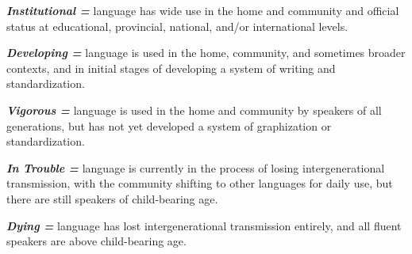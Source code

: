 \begin{styleBody}
\textbf{\textit{Institutional} \textit{=}} language has wide use in the home and community and official status at educational, provincial, national, and/or international levels. 
\end{styleBody}

\begin{styleBody}
\textbf{\textit{Developing} \textit{=}} language is used in the home, community, and sometimes broader contexts, and in initial stages of developing a system of writing and standardization. 
\end{styleBody}

\begin{styleBody}
\textbf{\textit{Vigorous} \textit{=}} language is used in the home and community by speakers of all generations, but has not yet developed a system of graphization or standardization. 
\end{styleBody}

\begin{styleBody}
\textbf{\textit{In} \textit{Trouble} \textit{=}} language is currently in the process of losing intergenerational transmission, with the community shifting to other languages for daily use, but there are still speakers of child-bearing age. 
\end{styleBody}

\begin{styleBody}
\textbf{\textit{Dying} \textit{=}} language has lost intergenerational transmission entirely, and all fluent speakers are above child-bearing age.
\end{styleBody}

\tablefirsthead{}

